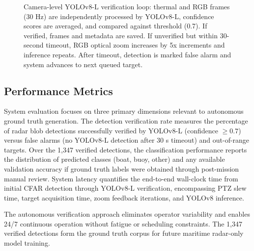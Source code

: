 \documentclass[conf]{asmeconf}
\begin{document}
\begin{figure}[t]
\caption{Camera-level YOLOv8-L verification loop: thermal and RGB frames (30 Hz) are independently processed by YOLOv8-L, confidence scores are averaged, and compared against threshold (0.7). If verified, frames and metadata are saved. If unverified but within 30-second timeout, RGB optical zoom increases by 5x increments and inference repeats. After timeout, detection is marked false alarm and system advances to next queued target.}
\label{fig:yolo_loop}
\end{figure}

\subsection{Performance Metrics}

System evaluation focuses on three primary dimensions relevant to autonomous ground truth generation. The detection verification rate measures the percentage of radar blob detections successfully verified by YOLOv8-L (confidence $\geq 0.7$) versus false alarms (no YOLOv8-L detection after 30 s timeout) and out-of-range targets. Over the 1,347 verified detections, the classification performance reports the distribution of predicted classes (boat, buoy, other) and any available validation accuracy if ground truth labels were obtained through post-mission manual review. System latency quantifies the end-to-end wall-clock time from initial CFAR detection through YOLOv8-L verification, encompassing PTZ slew time, target acquisition time, zoom feedback iterations, and YOLOv8 inference.

The autonomous verification approach eliminates operator variability and enables 24/7 continuous operation without fatigue or scheduling constraints. The 1,347 verified detections form the ground truth corpus for future maritime radar-only model training.
\end{document}
